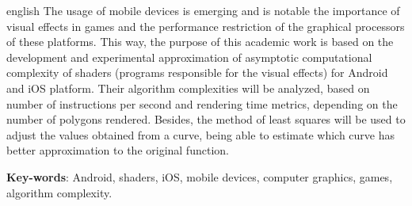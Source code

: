 \begin{resumo}[Abstract]
 \begin{otherlanguage*}{english}
  	The usage of mobile devices is emerging and is notable the importance of visual effects in games and the performance restriction of the graphical processors of these platforms. This way, the purpose of this academic work is based on the development and experimental approximation of asymptotic computational complexity of shaders (programs responsible for the visual effects) for Android and iOS platform. Their algorithm complexities will be analyzed, based on number of instructions per second and rendering time metrics, depending on the number of polygons rendered. Besides, the method of least squares will be used to adjust the values obtained from a curve, being able to estimate which curve has better approximation to the original function.  

   \vspace{\onelineskip}
 
   \noindent 
   \textbf{Key-words}: Android, shaders, iOS, mobile devices, computer graphics, games, algorithm complexity. 
 \end{otherlanguage*}
\end{resumo}

